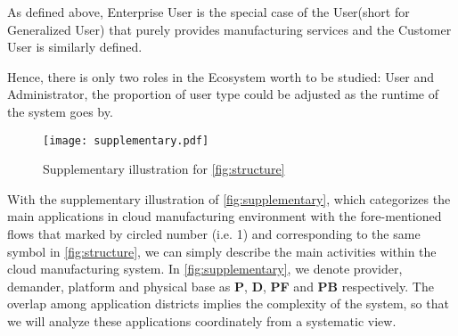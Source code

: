 

As defined above, Enterprise User is the special case of the User(short for Generalized User) that purely provides manufacturing services and the Customer User is similarly defined.

Hence, there is only two roles in the Ecosystem worth to be studied: User and Administrator, the proportion of user type could be adjusted as the runtime of the system goes by.

\begin{figure}[htbp]
\centering
\texttt{[image: supplementary.pdf]}
\caption{Supplementary illustration for \autoref{fig:structure}}
\label{fig:supplementary}
\end{figure}

With the supplementary illustration of \autoref{fig:supplementary}, which categorizes the main applications in cloud manufacturing environment with the fore-mentioned flows that marked by circled number (i.e. \textcircled{\small{1}}) and corresponding to the same symbol in \autoref{fig:structure}, we can simply describe the main activities within the cloud manufacturing system. In \autoref{fig:supplementary}, we denote provider, demander, platform and physical base as \textbf{P}, \textbf{D}, \textbf{PF} and \textbf{PB} respectively. The overlap among application districts implies the complexity of the system, so that we will analyze these applications coordinately from a systematic view.

